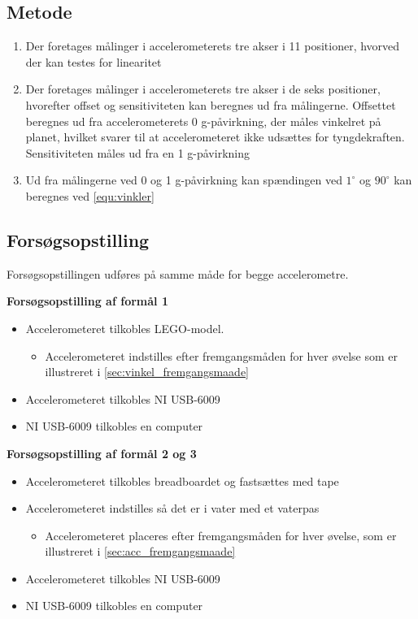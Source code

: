 \subsection{Metode}
\begin{enumerate}
\item Der foretages målinger i accelerometerets tre akser i 11 positioner, hvorved der kan testes for linearitet
\item Der foretages målinger i accelerometerets tre akser i de seks positioner, hvorefter offset og sensitiviteten kan beregnes ud fra målingerne. Offsettet beregnes ud fra accelerometerets 0 g-påvirkning, der måles vinkelret på planet, hvilket svarer til at accelerometeret ikke udsættes for tyngdekraften. Sensitiviteten måles ud fra en 1 g-påvirkning
\item Ud fra målingerne ved 0 og 1 g-påvirkning kan spændingen ved $1^{\circ}$ og $90^{\circ}$ kan beregnes ved \autoref{equ:vinkler}
\end{enumerate}

\subsection{Forsøgsopstilling}
Forsøgsopstillingen udføres på samme måde for begge accelerometre.

\textbf{Forsøgsopstilling af formål 1}
\begin{itemize}
\item Accelerometeret tilkobles LEGO-model.
\begin{itemize}
\item Accelerometeret indstilles efter fremgangsmåden for hver øvelse som er illustreret i \autoref{sec:vinkel_fremgangsmaade}
\end{itemize}
\item Accelerometeret tilkobles NI USB-6009
\item NI USB-6009 tilkobles en computer
\end{itemize}

\textbf{Forsøgsopstilling af formål 2 og 3}
\begin{itemize}
\item Accelerometeret tilkobles breadboardet og fastsættes med tape
\item Accelerometeret indstilles så det er i vater med et vaterpas
\begin{itemize}
\item Accelerometeret placeres efter fremgangsmåden for hver øvelse, som er illustreret i \autoref{sec:acc_fremgangsmaade}
\end{itemize}
\item Accelerometeret tilkobles NI USB-6009
\item NI USB-6009 tilkobles en computer
\end{itemize}

